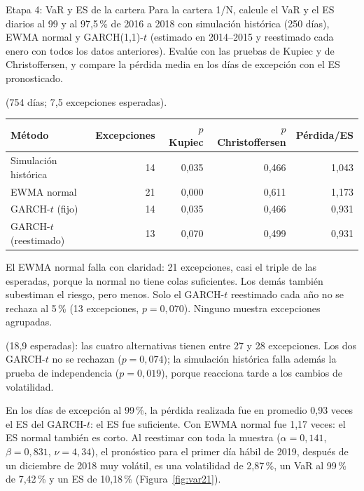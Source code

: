 \begin{ejresuelto}{Etapa 4: VaR y ES de la cartera}\label{ej:etapa4}
\enunciado Para la cartera 1/N, calcule el VaR y el ES diarios al 99 y al 97,5\,\% de 2016 a 2018 con simulación histórica (250 días), EWMA normal y
GARCH(1,1)-$t$ (estimado en 2014--2015 y reestimado cada enero con todos los datos anteriores). Evalúe con las pruebas de Kupiec y de Christoffersen, y
compare la pérdida media en los días de excepción con el ES pronosticado.

\solucion
{} (754 días; 7,5 excepciones esperadas).
\begin{center}\small
\begin{tabular}{@{}lrrrr@{}}
\toprule
Método & Excepciones & $p$ Kupiec & $p$ Christoffersen & Pérdida/ES \\
\midrule
Simulación histórica & 14 & 0,035 & 0,466 & 1,043 \\
EWMA normal & 21 & 0,000 & 0,611 & 1,173 \\
GARCH-$t$ (fijo) & 14 & 0,035 & 0,466 & 0,931 \\
GARCH-$t$ (reestimado) & 13 & 0,070 & 0,499 & 0,931 \\
\bottomrule
\end{tabular}
\end{center}
El EWMA normal falla con claridad: 21 excepciones, casi el triple de las esperadas, porque la normal no tiene colas suficientes. Los demás también
subestiman el riesgo, pero menos. Solo el GARCH-$t$ reestimado cada año no se rechaza al 5\,\% (13 excepciones, $p=0{,}070$). Ninguno muestra excepciones
agrupadas.

 (18,9 esperadas): las cuatro alternativas tienen entre 27 y 28 excepciones. Los dos GARCH-$t$ no se rechazan ($p=0{,}074$); la
simulación histórica falla además la prueba de independencia ($p=0{,}019$), porque reacciona tarde a los cambios de volatilidad.

 En los días de excepción al 99\,\%, la pérdida realizada fue en promedio 0,93 veces el ES del GARCH-$t$: el ES fue suficiente. Con EWMA
normal fue 1,17 veces: el ES normal también es corto. Al reestimar con toda la muestra ($\alpha=0{,}141$, $\beta=0{,}831$, $\nu=4{,}34$), el pronóstico para el
primer día hábil de 2019, después de un diciembre de 2018 muy volátil, es una volatilidad de 2,87\,\%, un VaR al 99\,\% de 7,42\,\% y un ES de 10,18\,\%
(Figura~\ref{fig:var21}).



\end{ejresuelto}

